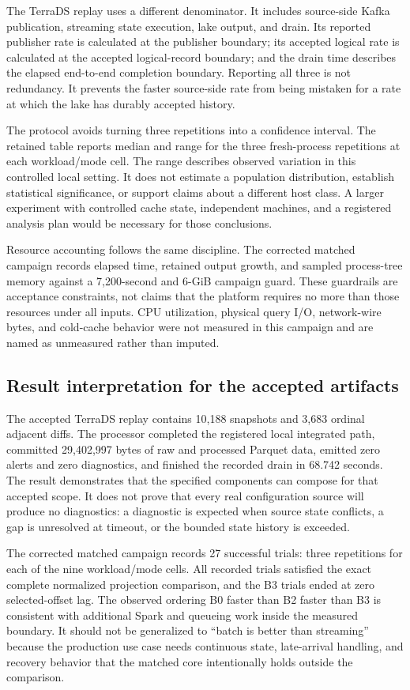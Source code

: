 The TerraDS replay uses a different denominator. It includes source-side Kafka publication, streaming state execution, lake output, and drain. Its reported publisher rate is calculated at the publisher boundary; its accepted logical rate is calculated at the accepted logical-record boundary; and the drain time describes the elapsed end-to-end completion boundary. Reporting all three is not redundancy. It prevents the faster source-side rate from being mistaken for a rate at which the lake has durably accepted history.

The protocol avoids turning three repetitions into a confidence interval. The retained table reports median and range for the three fresh-process repetitions at each workload/mode cell. The range describes observed variation in this controlled local setting. It does not estimate a population distribution, establish statistical significance, or support claims about a different host class. A larger experiment with controlled cache state, independent machines, and a registered analysis plan would be necessary for those conclusions.

Resource accounting follows the same discipline. The corrected matched campaign records elapsed time, retained output growth, and sampled process-tree memory against a 7,200-second and 6-GiB campaign guard. These guardrails are acceptance constraints, not claims that the platform requires no more than those resources under all inputs. CPU utilization, physical query I/O, network-wire bytes, and cold-cache behavior were not measured in this campaign and are named as unmeasured rather than imputed.

\subsection{Result interpretation for the accepted artifacts}

The accepted TerraDS replay contains 10,188 snapshots and 3,683 ordinal adjacent diffs. The processor completed the registered local integrated path, committed 29,402,997 bytes of raw and processed Parquet data, emitted zero alerts and zero diagnostics, and finished the recorded drain in 68.742 seconds. The result demonstrates that the specified components can compose for that accepted scope. It does not prove that every real configuration source will produce no diagnostics: a diagnostic is expected when source state conflicts, a gap is unresolved at timeout, or the bounded state history is exceeded.

The corrected matched campaign records 27 successful trials: three repetitions for each of the nine workload/mode cells. All recorded trials satisfied the exact complete normalized projection comparison, and the B3 trials ended at zero selected-offset lag. The observed ordering B0 faster than B2 faster than B3 is consistent with additional Spark and queueing work inside the measured boundary. It should not be generalized to ``batch is better than streaming'' because the production use case needs continuous state, late-arrival handling, and recovery behavior that the matched core intentionally holds outside the comparison.

